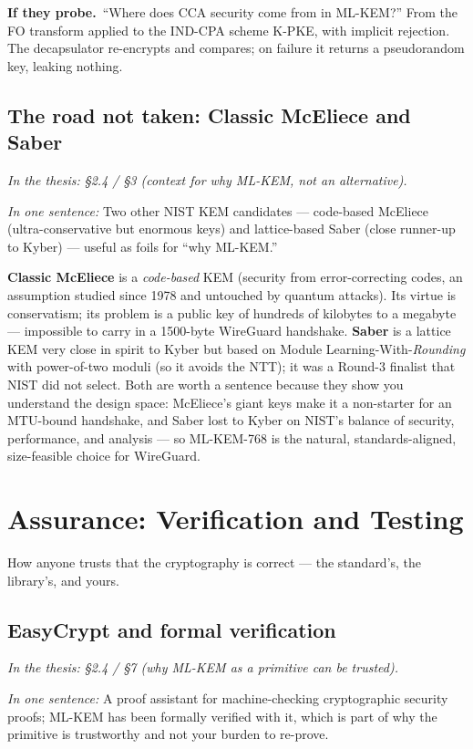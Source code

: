 \documentclass[11pt]{article}
\newcommand{\seethesis}[1]{%
  {\small\color{softgray}\textit{In the thesis: #1}}\par\vspace{3pt}}
\newcommand{\keyq}[1]{%
  \par\vspace{0.4em}%
  \noindent\colorbox{boxbg}{%
    \parbox{\dimexpr\textwidth-2\fboxsep}{%
      \small\textbf{\color{deepcyan}If they probe.}\ #1}}%
  \par\vspace{0.5em}}
\newcommand{\nutshell}[1]{\noindent\textit{In one sentence:} #1\par\vspace{4pt}}
\begin{document}
\keyq{``Where does CCA security come from in ML-KEM?'' From the FO transform
applied to the IND-CPA scheme K-PKE, with implicit rejection. The decapsulator
re-encrypts and compares; on failure it returns a pseudorandom key, leaking
nothing.}

\subsection{The road not taken: Classic McEliece and Saber}
\seethesis{\S2.4 / \S3 (context for why ML-KEM, not an alternative).}
\nutshell{Two other NIST KEM candidates --- code-based McEliece (ultra-conservative
but enormous keys) and lattice-based Saber (close runner-up to Kyber) --- useful
as foils for ``why ML-KEM.''}

\textbf{Classic McEliece} is a \emph{code-based} KEM (security from
error-correcting codes, an assumption studied since 1978 and untouched by
quantum attacks). Its virtue is conservatism; its problem is a public key of
hundreds of kilobytes to a megabyte --- impossible to carry in a 1500-byte
WireGuard handshake. \textbf{Saber} is a lattice KEM very close in spirit to
Kyber but based on Module Learning-With-\emph{Rounding} with power-of-two moduli
(so it avoids the NTT); it was a Round-3 finalist that NIST did not select. Both
are worth a sentence because they show you understand the design space: McEliece's
giant keys make it a non-starter for an MTU-bound handshake, and Saber lost to
Kyber on NIST's balance of security, performance, and analysis --- so ML-KEM-768
is the natural, standards-aligned, size-feasible choice for WireGuard.

\section{Assurance: Verification and Testing}
How anyone trusts that the cryptography is correct --- the standard's, the
library's, and yours.

\subsection{EasyCrypt and formal verification}
\seethesis{\S2.4 / \S7 (why ML-KEM as a primitive can be trusted).}
\nutshell{A proof assistant for machine-checking cryptographic security proofs;
ML-KEM has been formally verified with it, which is part of why the primitive is
trustworthy and not your burden to re-prove.}
\end{document}
